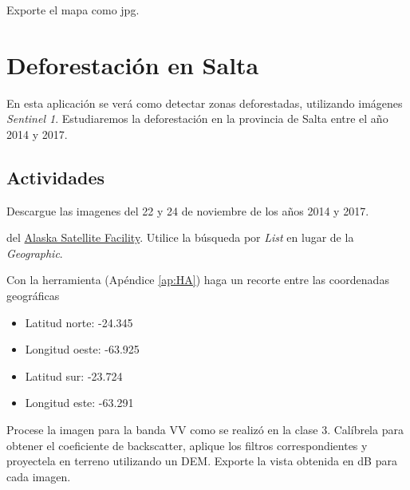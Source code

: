 \begin{que}
    Exporte el mapa como jpg.
\end{que}


\section{Deforestación en Salta}

En esta aplicación se verá como detectar zonas deforestadas, utilizando imágenes \emph{Sentinel 1}. Estudiaremos la deforestación en la provincia de Salta entre el año 2014 y 2017.


\subsection{Actividades}

\begin{que}
    Descargue las imagenes del 22 y 24 de noviembre de los años 2014 y 2017.
    \begin{center}\end{center}
      \begin{center}\end{center}
      del \href{https://vertex.daac.asf.alaska.edu/}{Alaska Satellite Facility}. Utilice la búsqueda por \emph{List} en lugar de la \emph{Geographic}.
\end{que}

\begin{que}
    Con la herramienta  (Apéndice \ref{ap:HA}) haga un recorte entre las coordenadas geográficas
    \begin{itemize}
        \item Latitud norte: -24.345
        \item Longitud oeste: -63.925
        \item Latitud sur: -23.724
        \item Longitud este: -63.291
    \end{itemize}
\end{que}

\begin{que}
    Procese la imagen para la banda VV como se realizó en la clase 3. Calíbrela para obtener el coeficiente de backscatter, aplique los filtros correspondientes y proyectela en terreno utilizando un DEM. Exporte la vista obtenida en dB para cada imagen.
\end{que}

